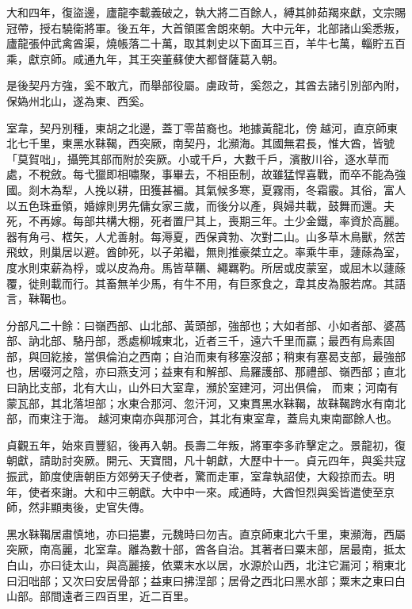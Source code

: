 \begin{pinyinscope}
 大和四年，復盜邊，廬龍李載義破之，執大將二百餘人，縛其帥茹羯來獻，文宗賜冠帶，授右驍衛將軍。後五年，大首領匿舍朗來朝。大中元年，北部諸山奚悉叛，廬龍張仲武禽酋渠，燒帳落二十萬，取其刺史以下面耳三百，羊牛七萬，輜貯五百乘，獻京師。咸通九年，其王突董蘇使大都督薩葛入朝。



 是後契丹方強，奚不敢亢，而舉部役屬。虜政苛，奚怨之，其酋去諸引別部內附，保媯州北山，遂為東、西奚。



 室韋，契丹別種，東胡之北邊，蓋丁零苗裔也。地據黃龍北，傍越河，直京師東北七千里，東黑水靺鞨，西突厥，南契丹，北瀕海。其國無君長，惟大酋，皆號「莫賀咄」，攝筦其部而附於突厥。小或千戶，大數千戶，濱散川谷，逐水草而處，不稅斂。每弋獵即相嘯聚，事畢去，不相臣制，故雖猛悍喜戰，而卒不能為強國。剡木為犁，人挽以耕，田獲甚褊。其氣候多寒，夏霧雨，冬霜霰。其俗，富人以五色珠垂領，婚嫁則男先傭女家三歲，而後分以產，與婦共載，鼓舞而還。夫死，不再嫁。每部共構大棚，死者置尸其上，喪期三年。土少金鐵，率資於高麗。器有角弓、楛矢，人尤善射。每溽夏，西保貣勃、次對二山。山多草木鳥獸，然苦飛蚊，則巢居以避。酋帥死，以子弟繼，無則推豪桀立之。率乘牛車，蘧蒢為室，度水則束薪為桴，或以皮為舟。馬皆草韉、繩羈靮。所居或皮蒙室，或屈木以蘧蒢覆，徙則載而行。其畜無羊少馬，有牛不用，有巨豕食之，韋其皮為服若席。其語言，靺鞨也。


分部凡二十餘：曰嶺西部、山北部、黃頭部，強部也；大如者部、小如者部、婆萵部、訥北部、駱丹部，悉處柳城東北，近者三千，遠六千里而贏；最西有烏素固部，與回紇接，當俱倫泊之西南；自泊而東有移塞沒部；稍東有塞曷支部，最強部也，居啜河之陰，亦曰燕支河；益東有和解部、烏羅護部、那禮部、嶺西部；直北曰訥比支部，北有大山，山外曰大室韋，瀕於室建河，河出俱倫，
 而東；河南有蒙瓦部，其北落坦部；水東合那河、忽汗河，又東貫黑水靺鞨，故靺鞨跨水有南北部，而東注于海。越河東南亦與那河合，其北有東室韋，蓋烏丸東南鄙餘人也。



 貞觀五年，始來貢豐貂，後再入朝。長壽二年叛，將軍李多祚擊定之。景龍初，復朝獻，請助討突厥。開元、天寶間，凡十朝獻，大歷中十一。貞元四年，與奚共寇振武，節度使唐朝臣方郊勞天子使者，驚而走軍，室韋執詔使，大殺掠而去。明年，使者來謝。大和中三朝獻。大中中一來。咸通時，大酋怛烈與奚皆遣使至京師，然非顯夷後，史官失傳。



 黑水靺鞨居肅慎地，亦曰挹婁，元魏時曰勿吉。直京師東北六千里，東瀕海，西屬突厥，南高麗，北室韋。離為數十部，酋各自治。其著者曰粟末部，居最南，抵太白山，亦曰徒太山，與高麗接，依粟末水以居，水源於山西，北注它漏河；稍東北曰汨咄部；又次曰安居骨部；益東曰拂涅部；居骨之西北曰黑水部；粟末之東曰白山部。部間遠者三四百里，近二百里。




\end{pinyinscope}
